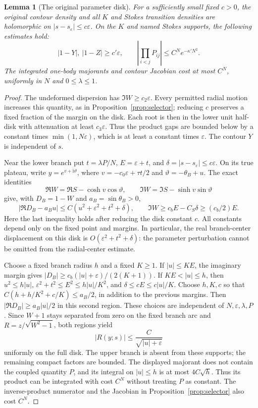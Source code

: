 \documentclass[11pt]{article}
\numberwithin{equation}{section}
\newtheorem{lemma}[theorem]{Lemma}
\theoremstyle{definition}
\newcommand{\ii}{\mathrm i}
\newcommand{\eps}{\varepsilon}
\newcommand{\se}{s_\varepsilon}
\begin{document}
\begin{lemma}[The original parameter disk]\label{lem:originaldisk}
For a sufficiently small fixed \(c>0\), the original contour
density and all \(K\) and Stokes transition densities are holomorphic
on \(|s-s_\eps|\le c\eps\). On the \(K\) and named Stokes
supports, the following estimates hold:
\[
 |1-Y|,\ |1-Z|\ge c'\eps,\qquad
 \left|\prod_{i<j}P_{ij}\right|\le C^Ne^{-\kappa' N^2}.
\]
The integrated one-body majorants and contour Jacobian cost
at most \(C^N\), uniformly in \(N\) and \(0\le\lambda\le1\).
\end{lemma}
\begin{proof}
The undeformed dispersion has \(\Im W\ge c_2\eps\).
Every permitted radial motion increases this quantity, as in
Proposition~\ref{prop:selector}; reducing \(c\) preserves a
fixed fraction of the margin on the disk. Each root is then
in the lower unit half-disk with attenuation at least \(c_3\eps\).
Thus the product gaps are bounded below by a constant times
\(\min(1,N\eps)\), which is at least a constant times \(\eps\).
The contour \(Y\) is independent of \(s\).

Near the lower branch put \(t=\lambda P/N\),
\(E=\eps+t\), and \(\delta=|s-\se|\le c\eps\).
On its true plateau, write
\(y=e^{v+\ii\vartheta}\), where
\(v=-c_0\eps+\tau t/2\) and \(\vartheta=-\theta_B+u\).
The exact identities
\[
 \Re W=\Re S-\cosh v\cos\vartheta,\qquad
 \Im W=\Im S-\sinh v\sin\vartheta
\]
give, with \(D_B=1-W\) and \(a_B=\sin\theta_B>0\),
\[
 |\Re D_B-a_Bu|
 \le C(u^2+\eps^2+t^2+\delta),\qquad
 \Im W\ge c_bE-C_S\delta\ge(c_b/2)E.
\]
Here the last inequality holds after reducing the disk constant
\(c\). All constants depend only on the fixed point and margins.
In particular, the real branch-center displacement on this disk is
\(O(\eps^2+t^2+\delta)\): the parameter perturbation cannot be
omitted from the radial-center estimate.

Choose a fixed branch radius \(h\) and a fixed \(K\ge1\).
If \(|u|\le KE\), the imaginary margin gives
\(|D_B|\ge c_b(|u|+\eps)/(2(K+1))\).
If \(KE<|u|\le h\), then
\(u^2\le h|u|\), \(\eps^2+t^2\le E^2\le h|u|/K^2\),
and \(\delta\le cE\le c|u|/K\).
Choose \(h,K,c\) so that
\(C(h+h/K^2+c/K)\le a_B/2\), in addition to the previous margins.
Then \(|\Re D_B|\ge a_B|u|/2\) in this second region.
These choices are independent of \(N,\eps,\lambda,P\).
Since \(W+1\) stays separated from zero on the fixed branch arc
and \(R=z/\sqrt{W^2-1}\), both regions yield
\[
 |R(y;s)|\le \frac{C}{\sqrt{|u|+\eps}}
\]
uniformly on the full disk. The upper branch is absent from
these supports; the remaining compact factors are bounded.
The displayed majorant does not contain the coupled quantity
\(P\), and its integral on \(|u|\le h\) is at most \(4C\sqrt h\).
Thus its product can be integrated with cost \(C^N\) without
treating \(P\) as constant. The inverse-product numerator
and the Jacobian in Proposition~\ref{prop:selector} also cost \(C^N\).


\end{proof}
\end{document}
